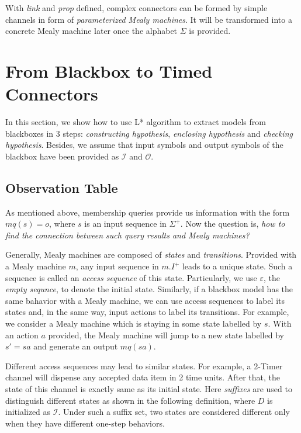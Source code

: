 \documentclass[conference, a4paper]{IEEEtran}
\begin{document}
With \emph{link} and \emph{prop} defined, complex connectors can be formed by simple channels in
form of \emph{parameterized Mealy machines}. It will be transformed into a concrete Mealy machine
later once the alphabet $\Sigma$ is provided.

\section{From Blackbox to Timed Connectors} 
\label{sec:activelearning}
In this section, we show how to use L* algorithm to extract models from blackboxes in  3 steps:
\emph{constructing hypothesis}, \emph{enclosing hypothesis} and \emph{checking hypothesis}. Besides,
we assume that input symbols and output symbols of the blackbox have been provided as $\mathcal{I}$
and $\mathcal{O}$.

\subsection{Observation Table}
As mentioned above, membership queries provide us information with the form $mq(s)=o$, where $s$ is
an input sequence in $\Sigma^{+}$. Now the question is, \emph{how to find the connection between
such query results and Mealy machines?}

Generally, Mealy machines are composed of \emph{states} and \emph{transitions}.
Provided with a Mealy machine $m$, any input sequence in $m.I^+$ leads to a unique state. 
Such a sequence is called an \emph{access sequence} of this state.
Particularly, we use $\varepsilon$, the \emph{empty sequnce}, to denote the initial state.
Similarly, if a blackbox model has the same bahavior with a Mealy machine, we can use access
sequences to label its states and, in the same way, input actions to label its transitions.
For example, we consider a Mealy machine which is staying in some state labelled by $s$. With an
action $a$ provided, the Mealy machine will jump to a new state labelled by $s'=sa$ and generate an
output $mq(sa)$. 

Different access sequences may lead to similar states. For example, a 2-Timer channel will dispense
any accepted data item in 2 time units. After that, the state of this channel is exactly same as its
initial state. Here \emph{suffixes} are used to distinguish different states as shown in the
following definition, where $D$ is initialized as $\mathcal{I}$. Under such a suffix set, two states
are considered different only when they have different one-step behaviors.
\end{document}
